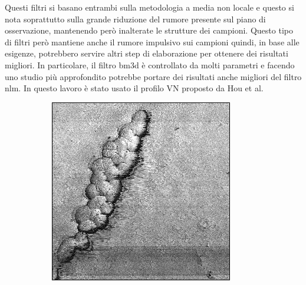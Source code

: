 \documentclass[../main.tex]{subfiles}
\begin{document}
Questi filtri si basano entrambi sulla metodologia a media non locale e questo si nota soprattutto sulla grande riduzione del rumore presente sul piano di osservazione, mantenendo però inalterate le strutture dei campioni. Questo tipo di filtri però mantiene anche il rumore impulsivo sui campioni quindi, in base alle esigenze, potrebbero servire altri step di elaborazione per ottenere dei risultati migliori. In particolare, il filtro \acrshort{bm3d} è controllato da molti parametri e facendo uno studio più approfondito potrebbe portare dei risultati anche migliori del filtro \acrshort{nlm}. In questo lavoro è stato usato il profilo VN proposto da Hou et al.\cite{hou_2011}

\newpage
\null
\vfill
\begin{figure}[!ht]
	\centering
	\begin{subfigure}{0.3\linewidth}
		\centering
		\includegraphics[keepaspectratio, width=\linewidth]{images/ef_o2a_orig.png}
	\end{subfigure}
	\hfill
	\begin{subfigure}{0.3\linewidth}
		\centering

\end{subfigure}
\end{figure}
\end{document}
